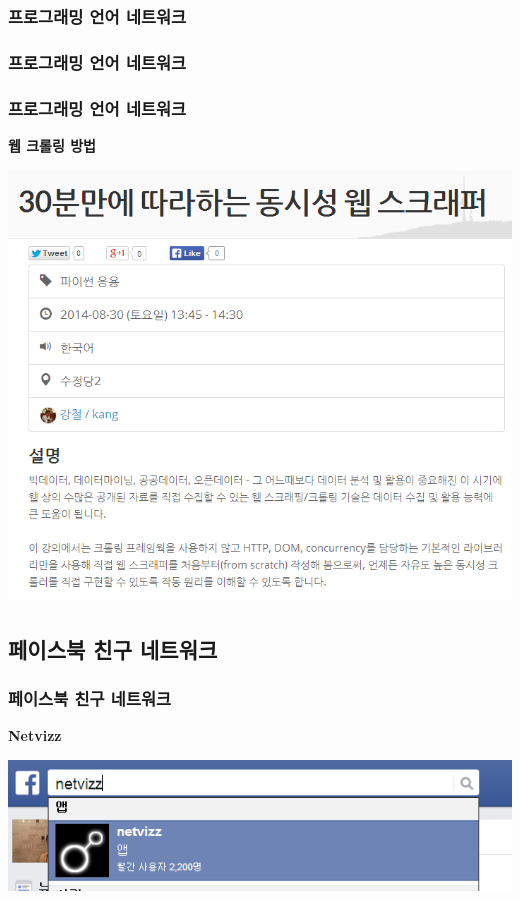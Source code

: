 \documentclass{beamer}
\newcommand{\fbckg}[1]{\usebackgroundtemplate{\texttt{[image: \#1]}}}%
\begin{document}
{
\fbckg{language_degree2.png}
\begin{frame}
\frametitle{프로그래밍 언어 네트워크}
\tiny
\color{blue}{Node Size = Degree}
\end{frame}
}

{
\fbckg{language_pagerank.png}
\begin{frame}
\frametitle{프로그래밍 언어 네트워크}
\tiny
{}
\end{frame}
}

\begin{frame}
\frametitle{프로그래밍 언어 네트워크}
\textbf{웹 크롤링 방법}
\begin{center}
\includegraphics[scale=0.6]{scrapper.png}
\end{center}
\end{frame}


\subsection{페이스북 친구 네트워크}
\begin{frame}
\frametitle{페이스북 친구 네트워크}
\textbf{Netvizz}
\begin{center}
\includegraphics{netvizz_1.png}
\end{center}
\end{frame}
\end{document}
